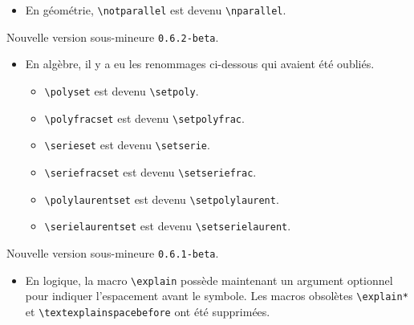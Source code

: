 \documentclass[12pt,a4paper]{article}
\begin{document}
\begin{description}
\begin{itemize}[itemsep=.5em]
\begin{itemize}[itemsep=.5em]
            \item \verb+\suprageo+ est devenu \verb+\seqsuprageo+.
        \end{itemize}
    
    
        \item En géométrie, \verb+\notparallel+ est devenu \verb+\nparallel+.
    \end{itemize}


    \medskip
    \item[2019-10-14] Nouvelle version sous-mineure \verb+0.6.2-beta+.
    
    \begin{itemize}[itemsep=.5em]
        \item En algèbre, il y a eu les renommages ci-dessous qui avaient été oubliés.
        \begin{itemize}[itemsep=.5em]
            \item \verb+\polyset+ est devenu \verb+\setpoly+.
    
            \item \verb+\polyfracset+ est devenu \verb+\setpolyfrac+.
    
            \item \verb+\serieset+ est devenu \verb+\setserie+.
    
            \item \verb+\seriefracset+ est devenu \verb+\setseriefrac+.
    
            \item \verb+\polylaurentset+ est devenu \verb+\setpolylaurent+.
    
            \item \verb+\serielaurentset+ est devenu \verb+\setserielaurent+.
        \end{itemize}
    \end{itemize}


    \medskip
    \item[2019-10-13] Nouvelle version sous-mineure \verb+0.6.1-beta+.
    
    \begin{itemize}[itemsep=.5em]
        \item En logique, la macro \verb+\explain+ possède maintenant un argument optionnel pour indiquer l'espacement avant le symbole. Les macros obsolètes \verb+\explain*+ et \verb+\textexplainspacebefore+ ont été supprimées.
    

\end{itemize}
\end{description}
\end{document}
